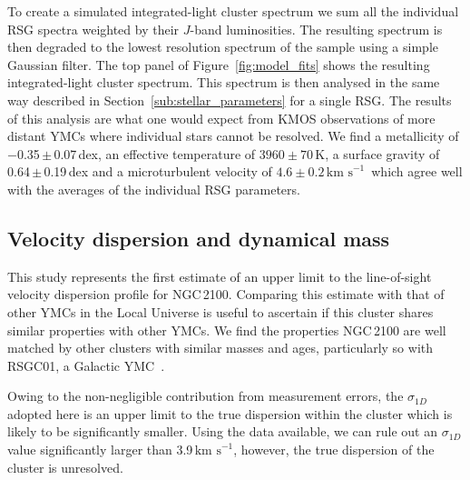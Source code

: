 \documentclass[useAMS,usenatbib]{mn2e}
\def\kms{$\mbox{km s}^{-1}$}
\begin{document}

To create a simulated integrated-light cluster spectrum we sum all the individual RSG spectra weighted by their $J$-band luminosities.
The resulting spectrum is then degraded to the lowest resolution spectrum of the sample using a simple Gaussian filter.
The top panel of Figure~\ref{fig:model_fits} shows the resulting integrated-light cluster spectrum.
This spectrum is then analysed in the same way described in Section~\ref{sub:stellar_parameters} for a single RSG.
The results of this analysis are what one would expect from KMOS observations of more distant YMCs where individual stars cannot be resolved.
We find a metallicity of $-$0.35\,$\pm$\,0.07\,dex, an effective temperature of $3960\pm70\,$K,
a surface gravity of 0.64\,$\pm$\,0.19\,dex and a microturbulent velocity of $4.6\pm0.2\,$\kms~which agree well with the averages of the individual RSG parameters.

\subsection{Velocity dispersion and dynamical mass} %
\label{sub:velocity_dispersion_Mdyn}

This study represents the first estimate of an upper limit to the line-of-sight velocity dispersion profile for NGC\,2100.
Comparing this estimate with that of other YMCs in the Local Universe is useful to ascertain if this cluster shares similar properties with other YMCs.
We find the properties NGC\,2100 are well matched by other clusters with similar masses and ages, particularly so with RSGC01, a Galactic YMC~\citep{2007ApJ...671..781D}.

Owing to the non-negligible contribution from measurement errors, the $\sigma_{1D}$ adopted here is an upper limit to the true dispersion within the cluster which is likely to be significantly smaller.
Using the data available, we can rule out an $\sigma_{1D}$ value significantly larger than 3.9\,\kms, however,
the true dispersion of the cluster is unresolved.
\end{document}
